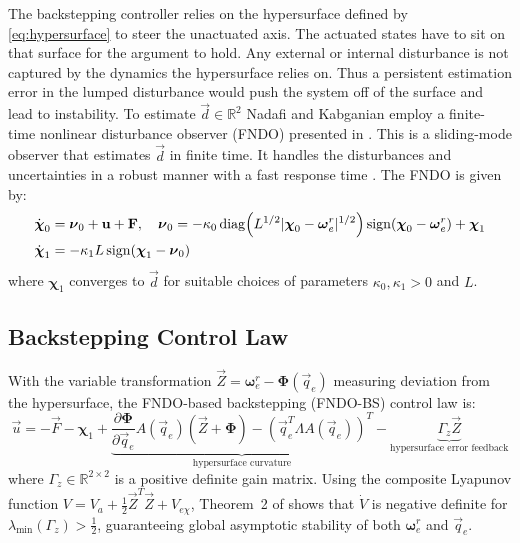 The backstepping controller relies on the hypersurface defined by \autoref{eq:hypersurface} to steer the unactuated axis. The actuated states have to sit on that surface for the argument to hold. Any external or internal disturbance is not captured by the dynamics the hypersurface relies on. Thus a persistent estimation error in the lumped disturbance would push the system off of the surface and lead to instability. To estimate $\vec{d} \in \mathbb{R}^2$ Nadafi and Kabganian employ a finite-time nonlinear disturbance observer (FNDO) presented in \cite{shihuaDisturbanceObserverBasedControl}. This is a sliding-mode observer that estimates $\vec{d}$ in finite time. It handles the disturbances and uncertainties in a robust manner with a fast response time \cite{huQinglei2014Dobf}. The FNDO is given by:
\begin{align}
    \dot{\boldsymbol{\chi}}_0 &= \boldsymbol{\nu}_0 + \vec{u} + \vec{F}, \quad
    \boldsymbol{\nu}_0 = -\kappa_0\,\mathrm{diag}\!\left(L^{1/2}|\boldsymbol{\chi}_0 - \boldsymbol{\omega}^r_e|^{1/2}\right)\mathrm{sign}(\boldsymbol{\chi}_0 - \boldsymbol{\omega}^r_e) + \boldsymbol{\chi}_1 \notag \\
    \dot{\boldsymbol{\chi}}_1 &= -\kappa_1 L\,\mathrm{sign}(\boldsymbol{\chi}_1 - \boldsymbol{\nu}_0)
\end{align}
where $\boldsymbol{\chi}_1$ converges to $\vec{d}$ for suitable choices of parameters $\kappa_0, \kappa_1 > 0$ and $L$.

\subsection{Backstepping Control Law}

With the variable transformation $\vec{Z} = \boldsymbol{\omega}^r_e - \boldsymbol{\Phi}(\vec{q}_e)$ measuring deviation from the hypersurface, the FNDO-based backstepping (FNDO-BS) control law is:
\begin{equation}
    \vec{u} = -\vec{F} - \boldsymbol{\chi}_1 + \underbrace{\frac{\partial\boldsymbol{\Phi}}{\partial\vec{q}_e}A(\vec{q}_e)(\vec{Z} + \boldsymbol{\Phi})
    - \left(\vec{q}_e^T \Lambda A(\vec{q}_e)\right)^T}_{\text{hypersurface curvature}} - \underbrace{\Gamma_z \vec{Z}}_{\text{hypersurface error feedback}}
    \label{eq:fndo_bs}
\end{equation}
where $\Gamma_z \in \mathbb{R}^{2\times 2}$ is a positive definite gain matrix. Using the composite Lyapunov function $V = V_a + \frac{1}{2}\vec{Z}^T\vec{Z} + V_{e\chi}$, Theorem~2 of \cite{nadafiRobustBacksteppingAttitude2021} shows that $\dot{V}$ is negative definite for $\lambda_{\min}(\Gamma_z) > \frac{1}{2}$, guaranteeing global asymptotic stability of both $\boldsymbol{\omega}^r_e$ and $\vec{q}_e$.

